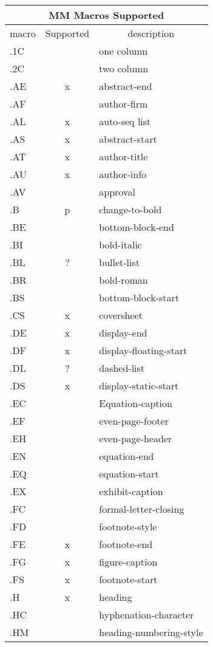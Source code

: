\noindent
\begin{center}
\begin{tabular}{|l|c|l|}
\hline
\multicolumn{3}{|c|}{{\vrule height12pt width0pt depth3.5pt\Large
MM Macros Supported}}\\ 
\hline\hline
macro&	 Supported&\multicolumn{1}{|c|}{description}\\
\hline
.1C&	&		one column\\
.2C&	&		two column\\
.AE&	x&		abstract-end\\
.AF&	&		author-firm\\
.AL&	x&		auto-seq list\\
.AS&	x&		abstract-start\\
.AT&	x&		author-title\\
.AU&	x&		author-info\\
.AV&	&		approval\\
.B&	p&		change-to-bold\\
.BE&	&		bottom-block-end\\
.BI&	&		bold-italic\\
.BL&	?&		bullet-list\\
.BR&	&		bold-roman\\
.BS&	&		bottom-block-start\\
.CS&	x&		coversheet\\
.DE&	x&		display-end\\
.DF&	x&		display-floating-start\\
.DL&	?&		dashed-list\\
.DS&	x&		display-static-start\\
.EC&	&		Equation-caption\\
.EF&	&		even-page-footer\\
.EH&	&		even-page-header\\
.EN&	&		equation-end\\
.EQ&	&		equation-start\\
.EX&	&		exhibit-caption\\
.FC&	&		formal-letter-closing\\
.FD&	&		footnote-style\\
.FE&	x&		footnote-end\\
.FG&	x&		figure-caption\\
.FS&	x&		footnote-start\\
.H&	x&		heading\\
.HC&	&		hyphenation-character\\
.HM&	&		heading-numbering-style\\

\end{tabular}
\end{center}
